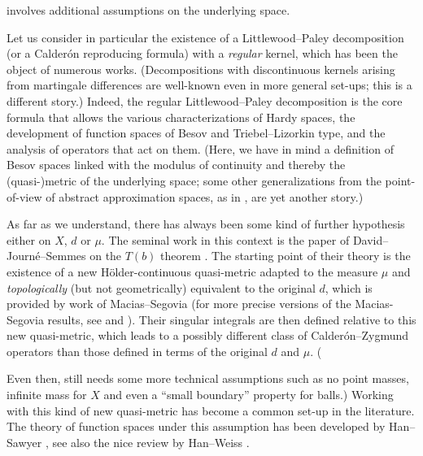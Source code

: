 \documentclass{amsart}
\numberwithin{equation}{section}
\theoremstyle{plain}
\theoremstyle{definition}
\theoremstyle{remark}
\begin{document}
 involves additional assumptions on the underlying space. {Let us consider in particular the existence of a Littlewood--Paley decomposition (or a Calder\'on reproducing formula) with a \emph{regular} kernel, which has been the object of numerous works. (Decompositions with discontinuous kernels arising from martingale differences are well-known even in more general set-ups; this is a different story.) Indeed, the regular Littlewood--Paley decomposition is the core formula that allows the various characterizations of Hardy spaces, the development of function spaces  of Besov and Triebel--Lizorkin type, and the analysis of operators that act on them.
(Here, we have in mind a definition of Besov spaces linked with the modulus of continuity and thereby the (quasi-)metric of the underlying space; some other generalizations from the point-of-view of abstract approximation spaces, as in \cite{MM}, are yet another story.)

As far as we understand, there has always been some kind of further hypothesis either on $X$, $d$ or $\mu$. The seminal work in this context is the paper of David--Journ\'e--Semmes on the $T(b)$ theorem \cite{DJS}. The starting point of their theory is the existence of a new H\"older-continuous quasi-metric {adapted to the measure $\mu$ and}
\emph{topologically} (but not geometrically) equivalent to the original $d$, which is provided by work of Macias--Segovia \cite[{Theorems 2 and 3}]{MS} { (for more precise {versions} of the Macias-Segovia results, see  \cite{PS} and \cite{MMMM})}. Their singular integrals are then defined relative to this new quasi-metric, which leads to a {possibly} different class of Calder\'on--Zygmund operators than those defined in terms of the original $d$ and $\mu$. ({{Even then, \cite{DJS} still needs}
some more technical assumptions such as no point masses, infinite mass for $X$ and even a ``small boundary'' property for balls.)
Working with this kind of new quasi-metric has become a common set-up in the literature.
The theory of function spaces under this assumption has been developed by Han--Sawyer \cite{HS}, see also the nice review by Han--Weiss \cite{HW}.

}}
\end{document}
